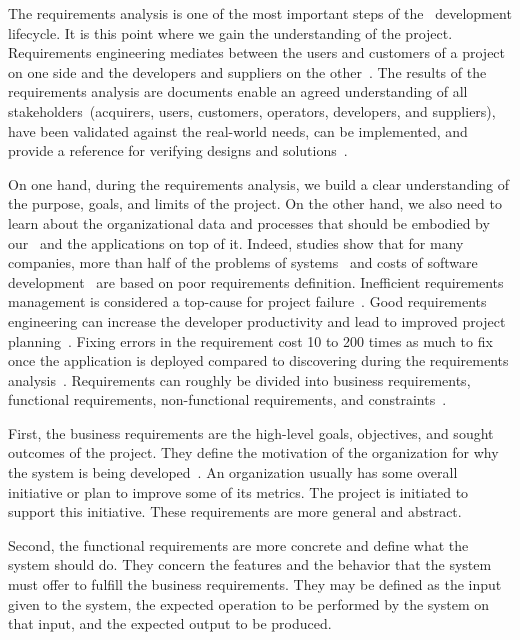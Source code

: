 %
%
The requirements analysis is one of the most important steps of the \db\ development lifecycle.
It is this point where we gain the understanding of the project.
Requirements engineering mediates between the users and customers of a project on one side and the developers and suppliers on the other~\cite{ISOIECIEEE2018SASELCPRE}.
The results of the requirements analysis are  documents enable an agreed understanding of all stakeholders~(acquirers, users, customers, operators, developers, and suppliers), have been validated against the real-world needs, can be implemented, and provide a reference for verifying designs and solutions~\cite{ISOIECIEEE2018SASELCPRE}.

On one hand, during the requirements analysis, we build a clear understanding of the purpose, goals, and limits of the project.
On the other hand, we also need to learn about the organizational data and processes that should be embodied by our \db\ and the applications on top of it.
Indeed, studies show that for many companies, more than half of the problems of systems~\cite{S2003ISA6P:RDARS} and costs of software development~\cite{IC2009BAB2TPTS} are based on poor requirements definition.
Inefficient requirements management is considered a top-cause for project failure~\cite{EDN2005RUIFACI}.
Good requirements engineering can increase the developer productivity and lead to improved project planning~\cite{DCVP2005READSDFFAC}.
Fixing errors in the requirement cost 10 to 200 times as much to fix once the application is deployed compared to discovering during the requirements analysis~\cite{BP1988UACSC,M2001FTEAOOP,RGJ2023EASARBFSAR}.%
%
Requirements can roughly be divided into business requirements, functional requirements, non-functional requirements, and constraints~\cite{I2018SAH}.

First, the business requirements are the high-level goals, objectives, and sought outcomes of the project.
They define the motivation of the organization for why the system is being developed~\cite{ISOIECIEEE2018SASELCPRE}.
An organization usually has some overall initiative or plan to improve some of its metrics.
The project is initiated to support this initiative.
These requirements are more general and abstract.

Second, the functional requirements are more concrete and define what the system should do.
They concern the features and the behavior that the system must offer to fulfill the business requirements.
They may be defined as the input given to the system, the expected operation to be performed by the system on that input, and the expected output to be produced.

